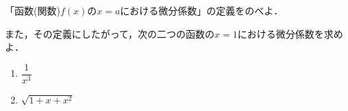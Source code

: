 \documentclass[../../main.tex]{subfiles}
\begin{document}
「函数(関数)$f(x)$の$x=a$における微分係数」の定義をのべよ．

また，その定義にしたがって，次の二つの函数の$x=1$における微分係数を求めよ．
\begin{enumerate}
  \item [(ア)]$\displaystyle\dfrac{1}{x^3}$
  \item [(イ)]$\sqrt{1+x+x^2}$
\end{enumerate}
\end{document}
